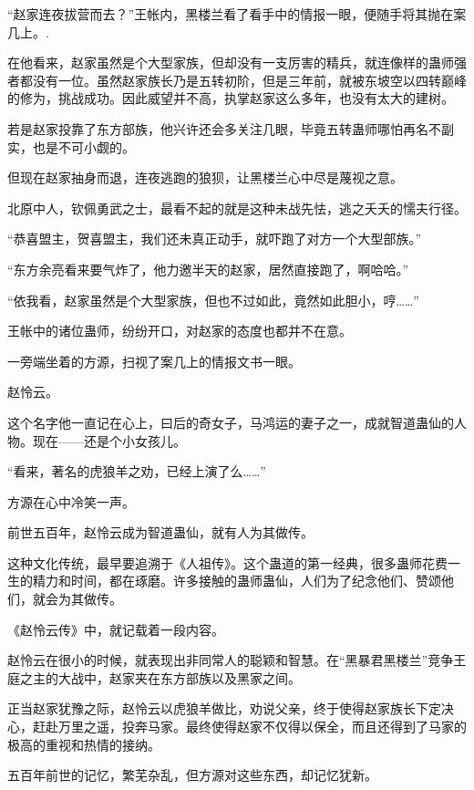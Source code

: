 
\begin{this_body}

“赵家连夜拔营而去？”王帐内，黑楼兰看了看手中的情报一眼，便随手将其抛在案几上。.

在他看来，赵家虽然是个大型家族，但却没有一支厉害的精兵，就连像样的蛊师强者都没有一位。虽然赵家族长乃是五转初阶，但是三年前，就被东坡空以四转巅峰的修为，挑战成功。因此威望并不高，执掌赵家这么多年，也没有太大的建树。

若是赵家投靠了东方部族，他兴许还会多关注几眼，毕竟五转蛊师哪怕再名不副实，也是不可小觑的。

但现在赵家抽身而退，连夜逃跑的狼狈，让黑楼兰心中尽是蔑视之意。

北原中人，钦佩勇武之士，最看不起的就是这种未战先怯，逃之夭夭的懦夫行径。

“恭喜盟主，贺喜盟主，我们还未真正动手，就吓跑了对方一个大型部族。”

“东方余亮看来要气炸了，他力邀半天的赵家，居然直接跑了，啊哈哈。”

“依我看，赵家虽然是个大型家族，但也不过如此，竟然如此胆小，哼……”

王帐中的诸位蛊师，纷纷开口，对赵家的态度也都并不在意。

一旁端坐着的方源，扫视了案几上的情报文书一眼。

赵怜云。

这个名字他一直记在心上，曰后的奇女子，马鸿运的妻子之一，成就智道蛊仙的人物。现在——还是个小女孩儿。

“看来，著名的虎狼羊之劝，已经上演了么……”

方源在心中冷笑一声。

前世五百年，赵怜云成为智道蛊仙，就有人为其做传。

这种文化传统，最早要追溯于《人祖传》。这个蛊道的第一经典，很多蛊师花费一生的精力和时间，都在琢磨。许多接触的蛊师蛊仙，人们为了纪念他们、赞颂他们，就会为其做传。

《赵怜云传》中，就记载着一段内容。

赵怜云在很小的时候，就表现出非同常人的聪颖和智慧。在“黑暴君黑楼兰”竞争王庭之主的大战中，赵家夹在东方部族以及黑家之间。

正当赵家犹豫之际，赵怜云以虎狼羊做比，劝说父亲，终于使得赵家族长下定决心，赶赴万里之遥，投奔马家。最终使得赵家不仅得以保全，而且还得到了马家的极高的重视和热情的接纳。

五百年前世的记忆，繁芜杂乱，但方源对这些东西，却记忆犹新。


\end{this_body}

